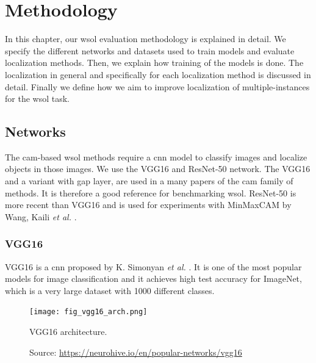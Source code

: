 \chapter{Methodology} \label{ch:methodology}

In this chapter, our \acrshort{wsol} evaluation methodology is explained in detail. We specify the different networks and datasets used to train models and evaluate localization methods. Then, we explain how training of the models is done. The localization in general and specifically for each localization method is discussed in detail. Finally we define how we aim to improve localization of multiple-instances for the \acrshort{wsol} task.

\section{Networks}
The \acrshort{cam}-based \acrshort{wsol} methods require a \acrshort{cnn} model to classify images and localize objects in those images. We use the VGG16 and ResNet-50 network. The VGG16 and a variant with \acrshort{gap} layer, are used in a many papers \cite{zhou2016cvpr, selvaraju2017grad, chattopadhyay2017grad, wang2020score, wang2021minmaxcam} of the \acrshort{cam} family of methods. It is therefore a good reference for benchmarking \acrshort{wsol}. ResNet-50 is more recent than VGG16 and is used for experiments with MinMaxCAM by Wang, Kaili \textit{et al.} \cite{wang2021minmaxcam}.

\subsection{VGG16}
VGG16 is a \acrshort{cnn} proposed by K. Simonyan \textit{et al.} \cite{simonyan2014very}. It is one of the most popular models for image classification and it achieves high test accuracy for ImageNet, which is a very large dataset with 1000 different classes.
\begin{figure}[ht]
    \begin{center}       
    \texttt{[image: fig\_vgg16\_arch.png]}
    \caption[VGG16 architecture]{VGG16 architecture.}
    \caption*{Source: \href{https://neurohive.io/en/popular-networks/vgg16}{https://neurohive.io/en/popular-networks/vgg16}}
    \label{fig:vgg16_arch}
    \end{center}
\end{figure}

